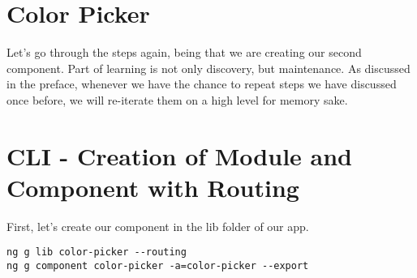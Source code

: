 \maketitle{}
\section{ Color Picker }

Let's go through the steps again, being that we are creating our second
component. Part of learning is not only discovery, but maintenance. As discussed
in the preface, whenever we have the chance to repeat steps we have discussed
once before, we will re-iterate them on a high level for memory sake.

\section{ CLI - Creation of Module and Component with Routing }
First, let's create our component in the lib folder of our app.

\begin{lstlisting}
ng g lib color-picker --routing
ng g component color-picker -a=color-picker --export
\end{lstlisting}
